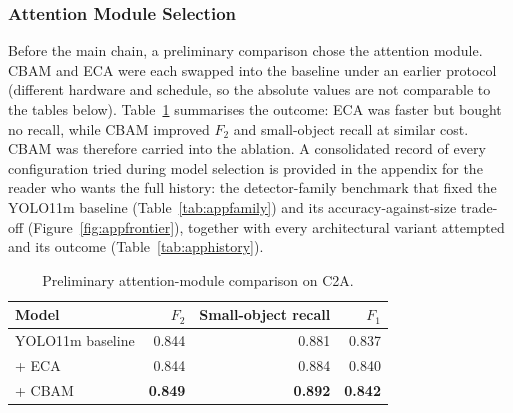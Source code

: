 \subsubsection{Attention Module Selection}
Before the main chain, a preliminary comparison chose the attention module.
CBAM and ECA were each swapped into the baseline under an earlier protocol
(different hardware and schedule, so the absolute values are not comparable
to the tables below). Table~\ref{tab:eca} summarises the outcome: ECA was
faster but bought no recall, while CBAM improved $F_2$ and small-object
recall at similar cost. CBAM was therefore carried into the ablation. A
consolidated record of every configuration tried during model selection is
provided in the appendix for the reader who wants the full history: the
detector-family benchmark that fixed the YOLO11m baseline
(Table~\ref{tab:appfamily}) and its accuracy-against-size trade-off
(Figure~\ref{fig:appfrontier}), together with every architectural variant
attempted and its outcome (Table~\ref{tab:apphistory}).

\begin{table}[tbp]
  \centering
  \caption{Preliminary attention-module comparison on C2A.}
  \label{tab:eca}
  \begin{tabular}{@{}l r r r@{}}
    \toprule
    Model & $F_2$ & Small-object recall & $F_1$ \\
    \midrule
    YOLO11m baseline & 0.844 & 0.881 & 0.837 \\
    + ECA            & 0.844 & 0.884 & 0.840 \\
    + CBAM           & \textbf{0.849} & \textbf{0.892} & \textbf{0.842} \\
    \bottomrule
  \end{tabular}
\end{table}


